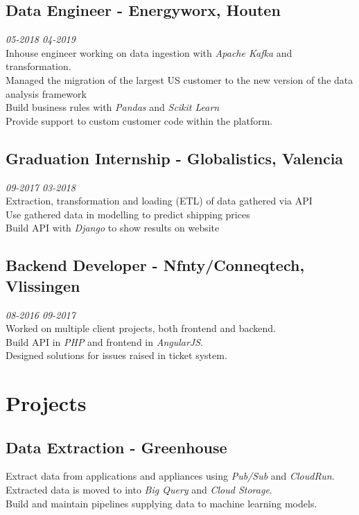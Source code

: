 \documentclass{article}
\begin{document}
\subsection{Data Engineer - Energyworx, Houten} \hfill {\em 05-2018 04-2019} \\
Inhouse engineer working on data ingestion with \emph{Apache Kafka} and transformation. \\
Managed the migration of the largest US customer to the new version of the data analysis framework \\
Build business rules with \emph{Pandas} and \emph{Scikit Learn} \\
Provide support to custom customer code within the platform. \\

\subsection{Graduation Internship - Globalistics, Valencia} \hfill {\em 09-2017 03-2018} \\
Extraction, transformation and loading (ETL) of data gathered via API \\
Use gathered data in modelling to predict shipping prices \\
Build API with \emph{Django} to show results on website \\


\subsection{Backend Developer - Nfnty/Conneqtech, Vlissingen} \hfill {\em 08-2016 09-2017} \\
Worked on multiple client projects, both frontend and backend. \\
Build API in \emph{PHP} and frontend in \emph{AngularJS}. \\
Designed solutions for issues raised in ticket system. \\


\section{Projects}
\subsection{Data Extraction - Greenhouse}
Extract data from applications and appliances using \emph{Pub/Sub} and \emph{CloudRun}. Extracted data is moved to into \emph{Big Query} and \emph{Cloud Storage}. \\
Build and maintain pipelines supplying data to machine learning models. \\
\end{document}
